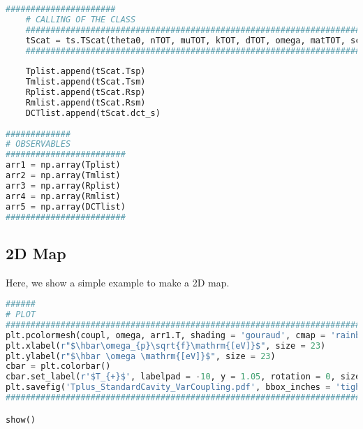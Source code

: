 \documentclass[showpacs,aps,prl,onecolumn,superscriptaddress]{revtex4-1}
\begin{document}
\begin{lstlisting}[language=Python, label=multPres, caption=Layers of a preserving FP.]
    ######################
    # CALLING OF THE CLASS 
    #########################################################################
    tScat = ts.TScat(theta0, nTOT, muTOT, kTOT, dTOT, omega, matTOT, scatTOT)  
    #########################################################################
    
    Tplist.append(tScat.Tsp)
    Tmlist.append(tScat.Tsm)
    Rplist.append(tScat.Rsp)
    Rmlist.append(tScat.Rsm)
    DCTlist.append(tScat.dct_s)
    
#############
# OBSERVABLES
########################    
arr1 = np.array(Tplist)
arr2 = np.array(Tmlist)
arr3 = np.array(Rplist)
arr4 = np.array(Rmlist)
arr5 = np.array(DCTlist)
########################
\end{lstlisting}

\subsection{2D Map}
Here, we show a simple example to make a 2D map.
\begin{lstlisting}[language=Python, caption=Plotting part]
######
# PLOT
#############################################################################
plt.pcolormesh(coupl, omega, arr1.T, shading = 'gouraud', cmap = 'rainbow') 
plt.xlabel(r"$\hbar\omega_{p}\sqrt{f}\mathrm{[eV]}$", size = 23)
plt.ylabel(r"$\hbar \omega \mathrm{[eV]}$", size = 23)
cbar = plt.colorbar()
cbar.set_label(r'$T_{+}$', labelpad = -10, y = 1.05, rotation = 0, size = 14)
plt.savefig('Tplus_StandardCavity_VarCoupling.pdf', bbox_inches = 'tight')
#############################################################################

show() 
\end{lstlisting}
\end{document}
